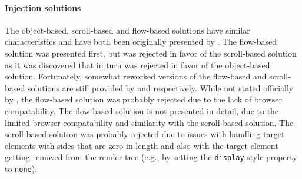 \documentclass[a4paper,11pt]{kth-mag}
\newcommand{\code}[1]{\texttt{#1}}
\begin{document}
        \paragraph{Injection solutions}
        The object-based, scroll-based and flow-based solutions have similar characteristics and have both been originally presented by \cite{backalley}.
        The flow-based solution was presented first, but was rejected in favor of the scroll-based solution as it was discovered that in turn was rejected in favor of the object-based solution.
        Fortunately, somewhat reworked versions of the flow-based and scroll-based solutions are still provided by \cite{eq_imp_prollyfill-min-width} and \cite{eq_imp_css-element-queries} respectively.
        While not stated officially by \cite{backalley}, the flow-based solution was probably rejected due to the lack of \gls{browser} compatability.
        The flow-based solution is not presented in detail, due to the limited \gls{browser} compatability and similarity with the scroll-based solution.
        The scroll-based solution was probably rejected due to issues with handling target \glspl{element} with sides that are zero in length and also with the target element getting removed from the \gls{render tree} (e.g., by setting the \code{display} style property to \code{none}).
\end{document}
